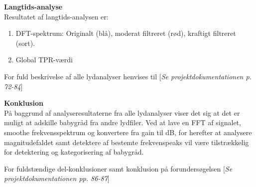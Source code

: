 \textbf{Langtids-analyse} \\
Resultatet af langtids-analysen er:
\begin{enumerate}
\item DFT-spektrum: Originalt (blå), moderat filtreret (rød), kraftigt filtreret (sort).
\item Global TPR-værdi
\end{enumerate}


For fuld beskrivelse af alle lydanalyser henvises til [\textit{Se projektdokumentationen p. 72-84}]

\textbf{Konklusion}\\ 
På baggrund af analyseresultaterne fra alle lydanalyser viser det sig at det er muligt at adskille babygråd fra andre lydfiler. Ved at lave en FFT af signalet, smoothe frekvensspektrum og konvertere fra gain til dB, for herefter at analysere magnitudefaldet samt detektere af bestemte frekvenspeaks vil være tilstrækkelig for detektering og kategorisering af babygråd. 

For fuldstændige del-konklusioner samt konklusion på forundersøgelsen [\textit{Se projektdokumentationen pp. 86-87}]